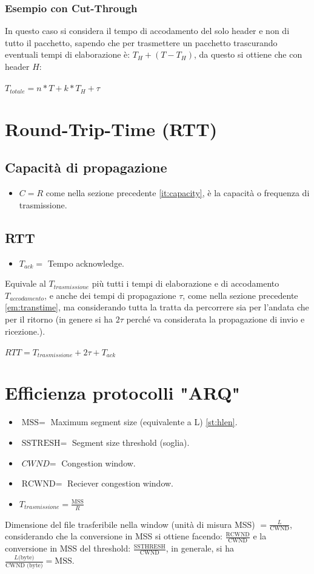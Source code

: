 \documentclass[a4paper]{report}
\begin{document}
{	\subsection{Esempio con Cut-Through}
	In questo caso si considera il tempo di accodamento del solo header e non di tutto il pacchetto, sapendo che per trasmettere un pacchetto trascurando eventuali tempi di elaborazione è: $T_{H} + (T - T_{H})$, da questo si ottiene che con header $H$:\\\\
	$T_{totale} = n * T + k * T_{H} + \tau$
	\chapter{Round-Trip-Time (RTT)} \label{cp:rtt}
	\section{Capacità di propagazione}
	\begin{itemize}
		\item $C = R$ come nella sezione precedente \ref{it:capacity}, è la capacità o frequenza di trasmissione.
	\end{itemize}
	\section{RTT}
	\begin{itemize}
		\item $T_{ack} =$ Tempo acknowledge.
	\end{itemize}
	Equivale al $T_{trasmissione}$ più tutti i tempi di elaborazione e di accodamento $T_{accodamento}$, e anche dei tempi di propagazione $\tau$, come nella sezione precedente \ref{em:transtime}, ma considerando tutta la tratta da percorrere sia per l'andata che per il ritorno (in genere si ha $2\tau$ perché va considerata la propagazione di invio e ricezione.).\\\\
	$RTT = T_{trasmissione} + 2\tau + T_{ack}$
	\chapter{Efficienza protocolli "ARQ"}
	\begin{itemize}
		\item $\text{MSS} = $ Maximum segment size (equivalente a L) \ref{st:hlen}.
		\item $\text{SSTRESH} = $ Segment size threshold (soglia).
		\item $\textit{CWND} = $ Congestion window.
		\item $\text{RCWND} = $ Reciever congestion window.
		\item $T_{trasmissione} = \frac{\text{MSS}}{R}$
	\end{itemize}
	Dimensione del file trasferibile nella window (unità di misura MSS) $= \frac{L}{\text{CWND}}$, considerando che la conversione in MSS si ottiene facendo:
	$\frac{\text{RCWND}}{\text{CWND}}$ e la conversione in MSS del threshold:
	$\frac{\text{SSTHRESH}}{\text{CWND}}$, in generale, si ha\\ $\frac{L\text{(byte)}}{\text{CWND (byte)}} = \text{MSS}$.
}
\end{document}
